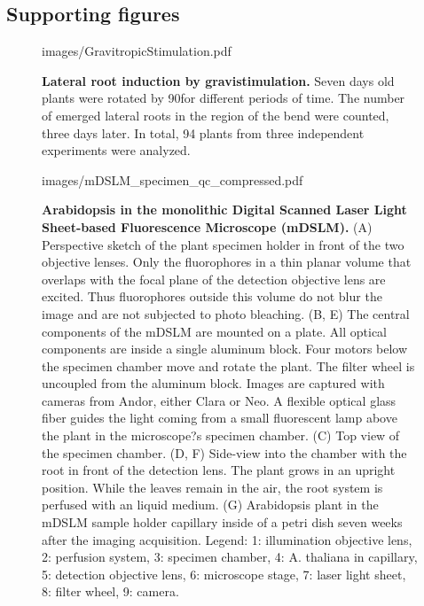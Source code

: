 \documentclass[11pt,a4paper, final]{article}
\begin{document}
\subsection{Supporting figures}
\setcounter{figure}{0}
\makeatletter 
\renewcommand{\thefigure}{S\@arabic\c@figure}
\makeatother
%
\begin{figure}[htbp]
	\begin{center}
	\begin{overpic}[width=1.\linewidth]{images/GravitropicStimulation.pdf}
	\end{overpic}
\caption[Lateral root induction by gravistimulation.]
{{\bf Lateral root induction by gravistimulation.} Seven days old plants were rotated by 90\degree for different periods of time. The number of emerged lateral roots in the region of the bend were counted, three days later. In total, 94 plants from three independent experiments were analyzed.}
	\label{fig:gravistimul}
	\end{center}
\end{figure}
%
\clearpage
\begin{figure}[htbp]
	\begin{center}
	\begin{overpic}[width=1.\linewidth]{images/mDSLM_specimen_qc_compressed.pdf}
	\end{overpic}
\caption[Arabidopsis in the monolithic Digital Scanned Laser Light Sheet-based Fluorescence Microscope (mDSLM).]
{{\bf Arabidopsis in the monolithic Digital Scanned Laser Light Sheet-based Fluorescence Microscope (mDSLM).} 
(A) Perspective sketch of the plant specimen holder in front of the two objective lenses. Only the fluorophores in a thin planar volume that overlaps with the focal plane of the detection objective lens are excited. Thus fluorophores outside this volume do not blur the image and are not subjected to photo bleaching. (B, E) The central components of the mDSLM are mounted on a plate. All optical components are inside a single aluminum block. Four motors below the specimen chamber move and rotate the plant. The filter wheel is uncoupled from the aluminum block. Images are captured with cameras from Andor, either Clara or Neo. A flexible optical glass fiber guides the light coming from a small fluorescent lamp above the plant in the microscope?s specimen chamber. (C) Top view of the specimen chamber. (D, F) Side-view into the chamber with the root in front of the detection lens. The plant grows in an upright position. While the leaves remain in the air, the root system is perfused with an liquid medium. (G) Arabidopsis plant in the mDSLM sample holder capillary inside of a petri dish seven weeks after the imaging acquisition. Legend: 1: illumination objective lens, 2: perfusion system, 3: specimen chamber, 4: A. thaliana in capillary, 5: detection objective lens, 6: microscope stage, 7: laser light sheet, 8: filter wheel, 9: camera.}
	\label{fig:mDSLM}
	\end{center}
\end{figure}
\end{document}
